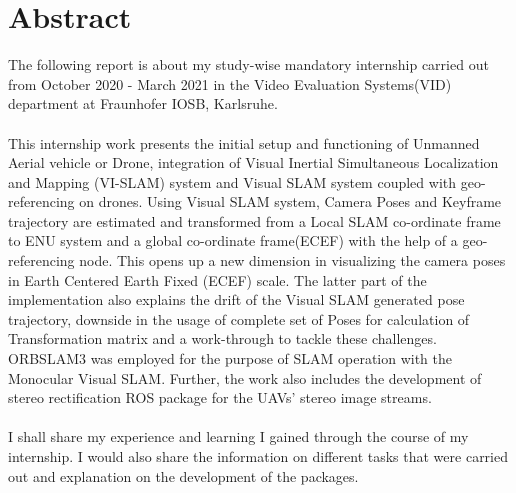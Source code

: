 \chapter*{Abstract}

The following report is about my study-wise mandatory internship carried out from October 2020 - March 2021 in the Video Evaluation Systems(VID) department at Fraunhofer IOSB, Karlsruhe.\\
\\
This internship work presents the initial setup and functioning of Unmanned Aerial vehicle or Drone, integration of Visual Inertial Simultaneous Localization and Mapping (VI-SLAM) system and Visual SLAM system coupled with geo-referencing on drones. Using Visual SLAM system, Camera Poses and Keyframe trajectory are estimated and transformed from a Local SLAM co-ordinate frame to ENU system and a global co-ordinate frame(ECEF) with the help of a geo-referencing node. This opens up a new dimension in visualizing the camera poses in Earth Centered Earth Fixed (ECEF) scale. The latter part of the implementation also explains the drift of the Visual SLAM generated pose trajectory, downside in the usage of complete set of Poses for calculation of Transformation matrix and a work-through to tackle these challenges. ORBSLAM3\cite{ORBSLAM3_2020} was employed for the purpose of SLAM operation with the Monocular Visual SLAM. Further, the work also includes the development of stereo rectification ROS package for the UAVs' stereo image streams.\\
\\
I shall share my experience and learning I gained through the course of my internship. I would also share the information on different tasks that were carried out and explanation on the development of the packages.